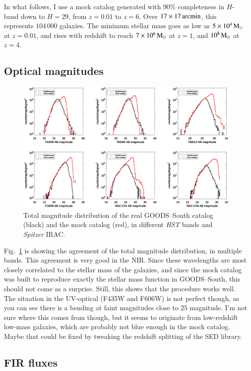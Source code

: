 \documentclass[12pt,a4paper]{article}
\newcommand{\rfig}[1]{Fig.~\ref{#1}}
\newcommand{\spitzer}{{\it Spitzer}\xspace}
\newcommand{\hst}{{\it HST}\xspace}
\newcommand{\msun}{{\rm M}_\odot}
\begin{document}
In what follows, I use a mock catalog generated with $90\%$ completeness in $H$-band down to $H=29$, from $z=0.01$ to $z=6$. Over $17\times17\,{\rm arcmin}$, this represents $104\,000$ galaxies. The minimum stellar mass goes as low as $5\times10^4\,\msun$ at $z=0.01$, and rises with redshift to reach $7\times10^6\,\msun$ at $z=1$, and $10^8\,\msun$ at $z=4$.


\subsection{Optical magnitudes}

\begin{figure}
\includegraphics[width=\textwidth]{mags}
\caption{\label{FIG:mags} Total magnitude distribution of the real GOODS--South catalog (black) and the mock catalog (red), in different \hst bands and \spitzer IRAC.}
\end{figure}

\rfig{FIG:mags} is showing the agreement of the total magnitude distribution, in multiple bands. This agreement is very good in the NIR. Since these wavelengths are most closely correlated to the stellar mass of the galaxies, and since the mock catalog was built to reproduce exactly the stellar mass function in GOODS--South, this should not come as a surprise. Still, this shows that the procedure works well. The situation in the UV-optical (F435W and F606W) is not perfect though, as you can see there is a bending at faint magnitudes close to $25$ magnitude. I'm not sure where this comes from though, but it seems to originate from low-redshift low-mass galaxies, which are probably not blue enough in the mock catalog. Maybe that could be fixed by tweaking the redshift splitting of the SED library.


\subsection{FIR fluxes}
\end{document}
